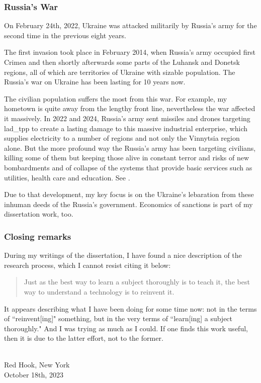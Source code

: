 \subsubsection*{Russia's War}

On February 24th, 2022, Ukraine was attacked militarily by Russia's army for the second time in the previous eight years. 

The first invasion took place in February 2014, when Russia's army occupied first Crimea and then shortly afterwards some parts of the Luhansk and Donetsk regions, all of which are territories of Ukraine with sizable population. The Russia's war on Ukraine has been lasting for 10 years now. 

The civilian population suffers the most from this war. For example, my hometown is quite away from the lengthy front line, nevertheless the war affected it massively. In 2022 and 2024, Russia's army sent missiles and drones targeting \ac{lad_tpp} to create a lasting damage to this massive industrial enterprise, which supplies electricity to a number of regions and not only the Vinnytsia region alone. But the more profound way the Russia's army has been targeting civilians, killing some of them but keeping those alive in constant terror and risks of new bombardments and of collapse of the systems that provide basic services such as utilities, health care and education. See \citep{bbc2022,yahoo2024}.  

Due to that development, my key focus is on the Ukraine's lebaration from these inhuman deeds of the Russia's government. Economics of sanctions is part of my dissertation work, too.

\subsubsection*{Closing remarks}

During my writings of the dissertation, I have found a nice description of the research process, which I cannot resist citing it below: 

\begin{quote}
Just as the best way to learn a subject thoroughly is to teach it, the best way to understand a technology is to reinvent it. \citep[p.~8]{gardiner2006}
\end{quote}

It appears describing what I have been doing for some time now: not in the terms of ``reinvent[ing]" something, but in the very terms of ``learn[ing] a subject thoroughly." And I was trying as much as I could. If one finds this work useful, then it is due to the latter effort, not to the former.

\begin{flushright}
   \MyName \\
   Red Hook, New York \\
   October 18th, 2023
\end{flushright}

\newpage
